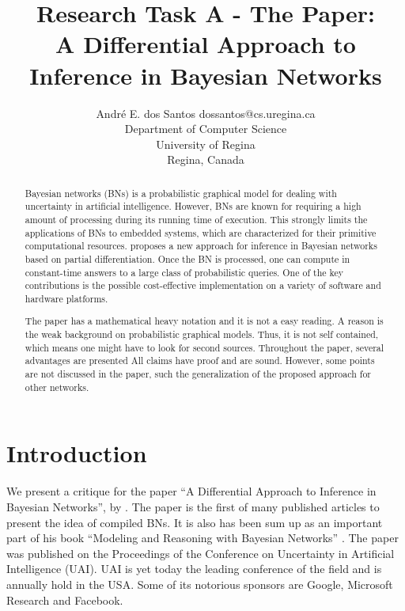\documentclass[twoside,11pt]{article}
\begin{document}
\title{Research Task A - The Paper: \\ A Differential Approach to Inference in Bayesian Networks}

\author{\name Andr\'e E. dos Santos \email dossantos@cs.uregina.ca \\
\addr Department of Computer Science \\
University of Regina \\ 
Regina, Canada
}



\maketitle

\begin{abstract}%
Bayesian networks (BNs) is a probabilistic graphical model for dealing with uncertainty in artificial intelligence.
However, BNs are known for requiring a high amount of processing during its running time of execution.
This strongly limits the applications of BNs to embedded systems, which are characterized for their primitive computational resources. 
\cite{darwiche00} proposes a new approach for inference in Bayesian networks based on partial differentiation.
Once the BN is processed, one can compute in constant-time answers to a large class of probabilistic queries.
One of the key contributions is the possible cost-effective implementation on a variety of software and hardware platforms.

The paper has a mathematical heavy notation and it is not a easy reading.
A reason is the weak background on probabilistic graphical models.
Thus, it is not self contained, which means one might have to look for second sources.
Throughout the paper, several advantages are presented
All claims have proof and are sound.
However, some points are not discussed in the paper, such the generalization of the proposed approach for other networks.
\end{abstract}


\section{Introduction}
\label{sec:intro}


We present a critique for the paper ``A Differential Approach to Inference in Bayesian Networks'', by \cite{darwiche00}.
The paper is the first of many published articles to present the idea of compiled BNs.
It is also has been sum up as an important part of his book ``Modeling and Reasoning with Bayesian Networks'' \citeyearpar{darwiche2009modeling}.
The paper was published on the Proceedings of the Conference on Uncertainty in Artificial Intelligence (UAI).
UAI is yet today the leading conference of the field and is annually hold in the USA.
Some of its notorious sponsors are Google, Microsoft Research and Facebook.
\end{document}
